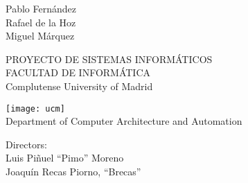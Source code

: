 \thispagestyle{empty}

\begin{center}
	{\Huge \textbf{\thetitle}}

	\vspace{1cm}
	{\large 
		Pablo Fernández\\
		Rafael de la Hoz\\
		Miguel Márquez
	}

	\vspace{1cm}
	PROYECTO DE SISTEMAS INFORMÁTICOS\\
	FACULTAD DE INFORMÁTICA\\
	Complutense University of Madrid
	\vspace{1cm}

	\texttt{[image: ucm]}\\
	\vspace{.5cm}
	Department of Computer Architecture and Automation\\
	\thedate
\end{center}

\begin{flushright}
	Directors:\\
	Luis Piñuel ``Pimo'' Moreno\\
	Joaquín Recas Piorno, ``Brecas''\\
\end{flushright}

